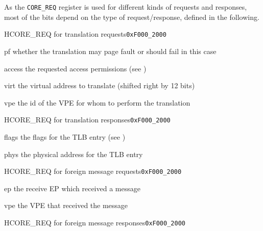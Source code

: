 \noindent As the \texttt{CORE\_REQ} register is used for different kinds of requests and responses,
most of the bits depend on the type of request/response, defined in the following.

\begin{register}{H}{CORE\_REQ for translation requests}{\texttt{0xF000\_2000}}
  \regnewline%
  \begin{regdesc}\begin{reglist}
    \item[pf] whether the translation may page fault or should fail in this case
    \item[access] the requested access permissions (see )
    \item[virt] the virtual address to translate (shifted right by 12 bits)
    \item[vpe] the id of the VPE for whom to perform the translation
  \end{reglist}\end{regdesc}
\end{register}

\begin{register}{H}{CORE\_REQ for translation responses}{\texttt{0xF000\_2000}}
  \regnewline%
  \begin{regdesc}\begin{reglist}
    \item[flags] the flags for the TLB entry (see )
    \item[phys] the physical address for the TLB entry
  \end{reglist}\end{regdesc}
\end{register}
\extend{}

\begin{register}{H}{CORE\_REQ for foreign message requests}{\texttt{0xF000\_2000}}
  \regnewline%
  \begin{regdesc}\begin{reglist}
    \item[ep] the receive EP which received a message
    \item[vpe] the VPE that received the message
  \end{reglist}\end{regdesc}
\end{register}

\begin{register}{H}{CORE\_REQ for foreign message responses}{\texttt{0xF000\_2000}}
  \regnewline%
\end{register}
\extend{}
